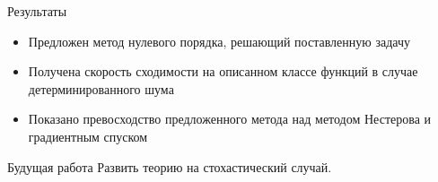 \documentclass{beamer}
\begin{document}
%


\begin{frame}{Результаты}
\begin{itemize}
 \item Предложен метод нулевого порядка, решающий поставленную задачу
 \item Получена скорость сходимости на описанном классе функций в случае детерминированного шума
 \item Показано превосходство предложенного метода над методом Нестерова и градиентным спуском
\end{itemize}

\begin{block}{Будущая работа}
 Развить теорию на стохастический случай.
\end{block}

\end{frame}
\end{document}
